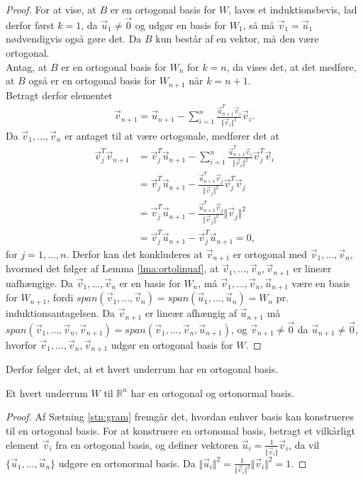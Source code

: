 \begin{proof}
For at  vise, at $B$ er en ortogonal basis for $W$, laves et induktionsbevis, lad derfor først $k= 1$, da $\vec{u}_1\neq \vec{0}$ og udgør en basis for $W_1$, så må $\vec{v}_1 = \vec{u}_1$ nødvendigvis også gøre det.
Da $B$ kun består af en vektor, må den være ortogonal.
\\Antag, at $B$ er en ortogonal basis for $W_n$ for $k=n$, da vises det, at det medføre, at $B$ også er en ortogonal basis for  $W_{n+1}$ når $k = n+1$.
\\Betragt derfor elementet 
\begin{align*}
\vec{v}_{n+1} = \vec{u}_{n+1} - \sum_{i=1}^n \frac{\vec{u}_{n+1}^T\vec{v}_i}{\Vert\vec{v}_i\Vert^2}\vec{v}_i.
\end{align*}
Da $\vec{v}_1,...,\vec{v}_n$ er antaget til at være ortogonale, medfører det at
\begin{align*}
\vec{v}_j^T\vec{v}_{n+1} &= \vec{v}_j^T\vec{u}_{n+1} - \sum_{i=1}^n \frac{\vec{u}_{n+1}^T\vec{v}_i}{\Vert\vec{v}_i\Vert^2}\vec{v}_j^T\vec{v}_i
\\ &= \vec{v}_j^T\vec{u}_{n+1} - \frac{\vec{u}_{n+1}^T\vec{v}_j}{\Vert\vec{v}_j\Vert^2}\vec{v}_j^T\vec{v}_j
\\ & = \vec{v}_j^T\vec{u}_{n+1} -  \frac{\vec{u}_{n+1}^T\vec{v}_j}{\Vert\vec{v}_j\Vert^2}\Vert\vec{v}_j\Vert^2
\\ & =\vec{v}_j^T\vec{u}_{n+1} - \vec{v}_j^T\vec{u}_{n+1} = 0 , 
\end{align*}
for $j = 1,...,n$. 
Derfor kan det konkluderes at $\vec{v}_{n+1}$ er ortogonal med $\vec{v}_1,...,\vec{v}_n$, hvormed det følger af Lemma \ref{lma:ortolinuaf}, at $\vec{v}_1,...,\vec{v}_n, \vec{v}_{n+1}$ er lineær uafhængige.
Da $\vec{v}_1,...,\vec{v}_n$ er en basis for $W_n$, må $\vec{v}_1,...,\vec{v}_n, \vec{u}_{n+1}$ være en basis for $W_{n+1}$, fordi $span(\vec{v}_1,...,\vec{v}_n) = span(\vec{u}_1,...,\vec{u}_n) = W_n$ pr. induktionsantagelsen. 
Da $\vec{v}_{n+1}$ er lineær afhængig af $\vec{u}_{n+1}$ må $span(\vec{v}_1,...,\vec{v}_n, \vec{v}_{n+1}) = span(\vec{v}_1,...,\vec{v}_n, \vec{u}_{n+1})$, og $\vec{v}_{n+1} \neq \vec{0}$ da $\vec{u}_{n+1} \neq \vec{0}$, hvorfor $\vec{v}_1,...,\vec{v}_n, \vec{v}_{n+1}$ udgør en ortogonal basis for $W$.
\end{proof}
Derfor følger det, at et hvert underrum har en ortogonal basis.
\begin{kor}
Et hvert underrum $W$ til $\mathds{R}^n$ har en ortogonal og ortonormal basis.
\end{kor}
\begin{proof}
Af Sætning \ref{stn:gram} fremgår det, hvordan enhver basis kan konstrueres til en ortogonal basis. 
For at konstruere en ortonomal basis, betragt et vilkårligt element $\vec{v}_i$ fra en ortogonal basis, og definer vektoren $\vec{u}_i = \frac{1}{\Vert\vec{v}_i\Vert}\vec{v}_i$, da vil $\{\vec{u}_1,...,\vec{u}_n\}$ udgøre en ortonormal basis. 
Da $\Vert\vec{u}_i\Vert^2 = \frac{1}{\Vert\vec{v}_i\Vert^2}\Vert\vec{v}_i\Vert^2 = 1$.
\end{proof}

